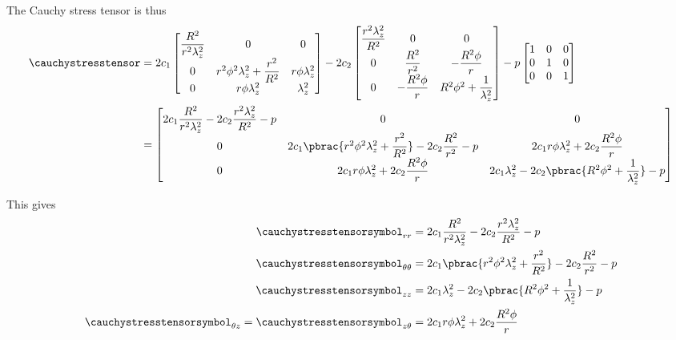 The Cauchy stress tensor is thus
\begin{equation}
  \begin{split}
    \cauchystresstensor &= 2c_{1}\begin{bmatrix}
      \dfrac{R^{2}}{r^{2}\lambda_{z}^2} & 0 & 0 \\
      0 & r^{2}\phi^{2}\lambda_{z}^{2}+\dfrac{r^{2}}{R^{2}} & r\phi\lambda_{z}^{2} \\
      0 & r\phi\lambda_{z}^{2} & \lambda_{z}^{2}
    \end{bmatrix}-2c_{2}\begin{bmatrix}
      \dfrac{r^{2}\lambda_{z}^{2}}{R^{2}} & 0 & 0 \\
      0 & \dfrac{R^{2}}{r^{2}} & -\dfrac{R^{2}\phi}{r} \\
      0 & -\dfrac{R^{2}\phi}{r} & R^{2}\phi^{2}+\dfrac{1}{\lambda_{z}^{2}}
    \end{bmatrix}-p\begin{bmatrix}
    1 & 0 & 0 \\
    0 & 1 & 0 \\
    0 & 0 & 1
    \end{bmatrix} \\
    &=\begin{bmatrix}
    2c_{1}\dfrac{R^{2}}{r^{2}\lambda_{z}^{2}}-2c_{2}\dfrac{r^{2}\lambda_{z}^{2}}{R^{2}} - p & 0 & 0 \\
    0 & 2c_{1}\pbrac{r^{2}\phi^{2}\lambda_{z}^{2}+\dfrac{r^{2}}{R^{2}}}-2c_{2}\dfrac{R^{2}}{r^{2}} - p & 2c_{1}r\phi\lambda_{z}^{2}+2c_{2}\dfrac{R^{2}\phi}{r} \\
    0 & 2c_{1}r\phi\lambda_{z}^{2}+2c_{2}\dfrac{R^{2}\phi}{r} & 2c_{1}\lambda_{z}^{2}-2c_{2}\pbrac{R^{2}\phi^{2}+\dfrac{1}{\lambda_{z}^{2}}}-p
    \end{bmatrix}
  \end{split}
\end{equation}

This gives
\begin{align}
  \cauchystresstensorsymbol_{rr}&=2c_{1}\dfrac{R^{2}}{r^{2}\lambda_{z}^{2}}-2c_{2}\dfrac{r^{2}\lambda_{z}^{2}}{R^{2}} -p\\
  \cauchystresstensorsymbol_{\theta\theta}&=2c_{1}\pbrac{r^{2}\phi^{2}\lambda_{z}^{2}+\dfrac{r^{2}}{R^{2}}}-2c_{2}\dfrac{R^{2}}{r^{2}} - p\\
  \cauchystresstensorsymbol_{zz}&=2c_{1}\lambda_{z}^{2}-2c_{2}\pbrac{R^{2}\phi^{2}+\dfrac{1}{\lambda_{z}^{2}}}-p\\
  \cauchystresstensorsymbol_{\theta z}=\cauchystresstensorsymbol_{z \theta}&= 2c_{1}r\phi\lambda_{z}^{2}+2c_{2}\dfrac{R^{2}\phi}{r} 
\end{align}

